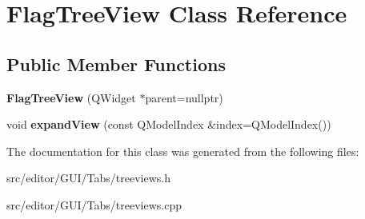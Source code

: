 \hypertarget{class_flag_tree_view}{\section{\-Flag\-Tree\-View \-Class \-Reference}
\label{class_flag_tree_view}
}
\subsection*{\-Public \-Member \-Functions}
\begin{DoxyCompactItemize}
\item 
\hypertarget{class_flag_tree_view_a86985ac668579405a7f48cb907f1f531}{{\bfseries \-Flag\-Tree\-View} (\-Q\-Widget $\ast$parent=nullptr)}\label{class_flag_tree_view_a86985ac668579405a7f48cb907f1f531}

\item 
\hypertarget{class_flag_tree_view_a9e83c94c3b971d01275c747ad30003ee}{void {\bfseries expand\-View} (const \-Q\-Model\-Index \&index=\-Q\-Model\-Index())}\label{class_flag_tree_view_a9e83c94c3b971d01275c747ad30003ee}

\end{DoxyCompactItemize}


\-The documentation for this class was generated from the following files\-:\begin{DoxyCompactItemize}
\item 
src/editor/\-G\-U\-I/\-Tabs/treeviews.\-h\item 
src/editor/\-G\-U\-I/\-Tabs/treeviews.\-cpp\end{DoxyCompactItemize}
